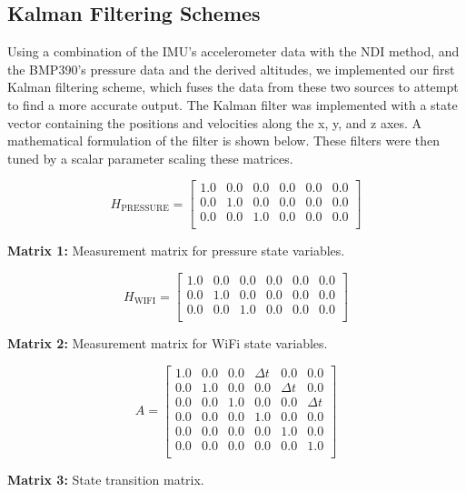 \subsection{Kalman Filtering Schemes}
Using a combination of the IMU's accelerometer data with the NDI method, and the BMP390's pressure data and the derived altitudes, we implemented our first Kalman filtering scheme, which fuses the data from these two sources to attempt to find a more accurate output. The Kalman filter was implemented with a state vector containing the positions and velocities along the x, y, and z axes. A mathematical formulation of the filter is shown below. These filters were then tuned by a scalar parameter scaling these matrices.
\par
\[
H_{\text{PRESSURE}} =
\begin{bmatrix}
1.0 & 0.0 & 0.0 & 0.0 & 0.0 & 0.0 \\
0.0 & 1.0 & 0.0 & 0.0 & 0.0 & 0.0 \\
0.0 & 0.0 & 1.0 & 0.0 & 0.0 & 0.0 \\
\end{bmatrix}
\]
\begin{center}
\textbf{Matrix 1:} Measurement matrix for pressure state variables.
\end{center}


\[
H_{\text{WIFI}} =
\begin{bmatrix}
1.0 & 0.0 & 0.0 & 0.0 & 0.0 & 0.0 \\
0.0 & 1.0 & 0.0 & 0.0 & 0.0 & 0.0 \\
0.0 & 0.0 & 1.0 & 0.0 & 0.0 & 0.0 \\
\end{bmatrix}
\]
\begin{center}
\textbf{Matrix 2:} Measurement matrix for WiFi state variables.
\end{center}


\[
A =
\begin{bmatrix}
1.0 & 0.0 & 0.0 & \Delta t & 0.0 & 0.0 \\
0.0 & 1.0 & 0.0 & 0.0 & \Delta t & 0.0 \\
0.0 & 0.0 & 1.0 & 0.0 & 0.0 & \Delta t \\
0.0 & 0.0 & 0.0 & 1.0 & 0.0 & 0.0 \\
0.0 & 0.0 & 0.0 & 0.0 & 1.0 & 0.0 \\
0.0 & 0.0 & 0.0 & 0.0 & 0.0 & 1.0 \\
\end{bmatrix}
\]
\begin{center}
\textbf{Matrix 3:} State transition matrix.
\end{center}

